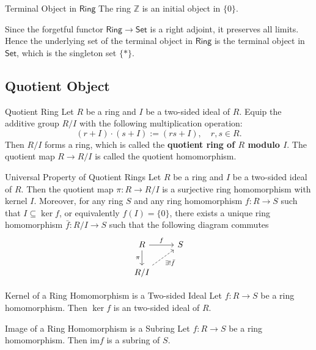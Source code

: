\begin{proposition}{Terminal Object in $\mathsf{Ring}$}{}
    The ring $\mathbb{Z}$ is an initial object in $\{0\}$.
\end{proposition}

Since the forgetful functor $\mathsf{Ring}\to\mathsf{Set}$ is a right adjoint, it preserves all limits. Hence the underlying set of the terminal object in $\mathsf{Ring}$ is the terminal object in $\mathsf{Set}$, which is the singleton set $\{*\}$.



\subsection{Quotient Object}
\begin{definition}{Quotient Ring}{}
    Let $R$ be a ring and $I$ be a two-sided ideal of $R$. Equip the additive group \( R / I \) with the following multiplication operation:
\[
(r+I) \cdot (s+I) := (rs + I), \quad r, s \in R .
\]
Then \( R / I \) forms a ring, which is called the \textbf{quotient ring of \( R \) modulo \( I \)}. The quotient map \( R \rightarrow R / I \) is called the quotient homomorphism.
\end{definition}

\begin{proposition}{Universal Property of Quotient Rings}{}
    Let $R$ be a ring and $I$ be a two-sided ideal of $R$. Then the quotient map $\pi:R\to R/I$ is a surjective ring homomorphism with kernel $I$. Moreover, for any ring $S$ and any ring homomorphism $f:R\to S$ such that $I\subseteq\ker f$, or equivalently $f(I)=\{0\}$, there exists a unique ring homomorphism $\bar{f}:R/I\to S$ such that the following diagram commutes
    \[
    \begin{tikzcd}[ampersand replacement=\&]
        R \arrow[r, "f"] \arrow[d, "\pi"'] \& S \\
        R/I \arrow[ru, "\exists!\bar{f}"', dashed] \&  
    \end{tikzcd}
    \] 
\end{proposition}

\begin{proposition}{Kernel of a Ring Homomorphism is a Two-sided Ideal}{}
    Let $f:R\to S$ be a ring homomorphism. Then $\ker f$ is an two-sided ideal of $R$.
\end{proposition}

\begin{proposition}{Image of a Ring Homomorphism is a Subring}{}
    Let $f:R\to S$ be a ring homomorphism. Then $\mathrm{im}f$ is a subring of $S$.
\end{proposition}

